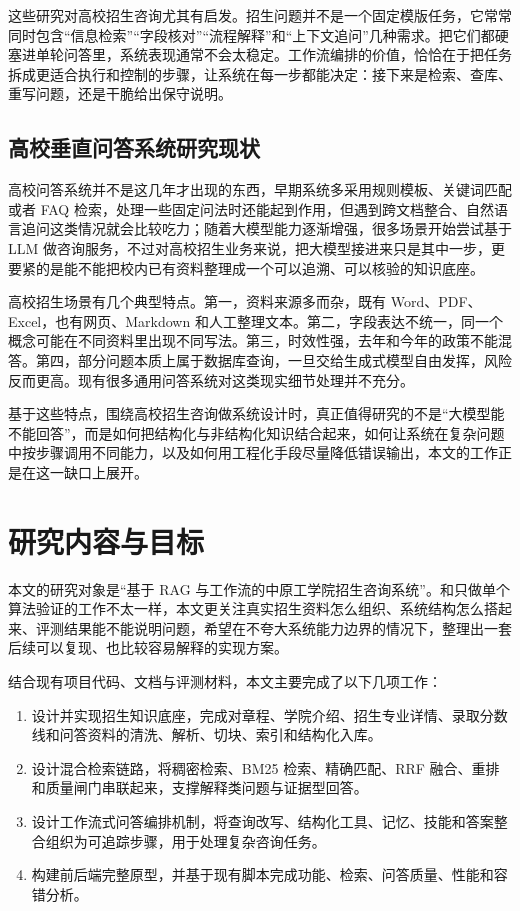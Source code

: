 \documentclass[UTF8,zihao=-4,oneside]{ctexbook}
\numberwithin{equation}{chapter}
\begin{document}
这些研究对高校招生咨询尤其有启发。招生问题并不是一个固定模版任务，它常常同时包含“信息检索”“字段核对”“流程解释”和“上下文追问”几种需求。把它们都硬塞进单轮问答里，系统表现通常不会太稳定。工作流编排的价值，恰恰在于把任务拆成更适合执行和控制的步骤，让系统在每一步都能决定：接下来是检索、查库、重写问题，还是干脆给出保守说明。

\subsection{高校垂直问答系统研究现状}
高校问答系统并不是这几年才出现的东西，早期系统多采用规则模板、关键词匹配或者 FAQ 检索，处理一些固定问法时还能起到作用，但遇到跨文档整合、自然语言追问这类情况就会比较吃力；随着大模型能力逐渐增强，很多场景开始尝试基于 LLM 做咨询服务，不过对高校招生业务来说，把大模型接进来只是其中一步，更要紧的是能不能把校内已有资料整理成一个可以追溯、可以核验的知识底座。

高校招生场景有几个典型特点。第一，资料来源多而杂，既有 Word、PDF、Excel，也有网页、Markdown 和人工整理文本。第二，字段表达不统一，同一个概念可能在不同资料里出现不同写法。第三，时效性强，去年和今年的政策不能混答。第四，部分问题本质上属于数据库查询，一旦交给生成式模型自由发挥，风险反而更高。现有很多通用问答系统对这类现实细节处理并不充分。

基于这些特点，围绕高校招生咨询做系统设计时，真正值得研究的不是“大模型能不能回答”，而是如何把结构化与非结构化知识结合起来，如何让系统在复杂问题中按步骤调用不同能力，以及如何用工程化手段尽量降低错误输出，本文的工作正是在这一缺口上展开。

\section{研究内容与目标}
本文的研究对象是“基于 RAG 与工作流的中原工学院招生咨询系统”。和只做单个算法验证的工作不太一样，本文更关注真实招生资料怎么组织、系统结构怎么搭起来、评测结果能不能说明问题，希望在不夸大系统能力边界的情况下，整理出一套后续可以复现、也比较容易解释的实现方案。

结合现有项目代码、文档与评测材料，本文主要完成了以下几项工作：
\begin{enumerate}
  \item 设计并实现招生知识底座，完成对章程、学院介绍、招生专业详情、录取分数线和问答资料的清洗、解析、切块、索引和结构化入库。
  \item 设计混合检索链路，将稠密检索、BM25 检索、精确匹配、RRF 融合、重排和质量闸门串联起来，支撑解释类问题与证据型回答。
  \item 设计工作流式问答编排机制，将查询改写、结构化工具、记忆、技能和答案整合组织为可追踪步骤，用于处理复杂咨询任务。
  \item 构建前后端完整原型，并基于现有脚本完成功能、检索、问答质量、性能和容错分析。
\end{enumerate}
\end{document}
